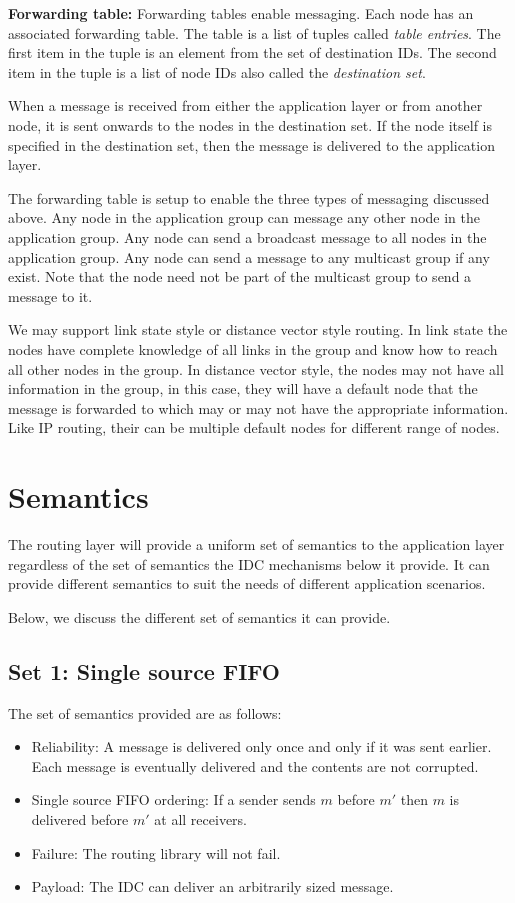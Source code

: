 \documentclass[a4paper,twoside]{report} %
\begin{document}
\textbf{Forwarding table:}
Forwarding tables enable messaging.
Each node has an associated forwarding table.
The table is a list of tuples called \emph{table entries}.
The first item in the tuple is an element from the set of destination IDs.
The second item in the tuple is a list of node IDs
also called the \emph{destination set}.

When a message is received from either the application layer or
from another node, it is sent onwards to the nodes in the destination set.
If the node itself is specified in the destination set,
then the message is delivered to the application layer.

The forwarding table is setup to enable the three types
of messaging discussed above.
Any node in the application group can message
any other node in the application group.
Any node can send a broadcast message to all nodes in the application group.
Any node can send a message to any multicast group if any exist.
Note that the node need not be part of the multicast group
to send a message to it.

We may support link state style or distance vector style routing.
In link state the nodes have complete knowledge of all links in the group
and know how to reach all other nodes in the group.
In distance vector style, the nodes may not have all information in the group,
in this case, they will have a default node that the message is forwarded to
which may or may not have the appropriate information.
Like IP routing, their can be multiple default nodes
for different range of nodes.

\section{Semantics}\label{sec:semantics}

The routing layer will provide a uniform set of semantics to the
application layer regardless of the set of semantics the
IDC mechanisms below it provide.
It can provide different semantics to suit the
needs of different application scenarios.

Below, we discuss the different set of semantics it can provide.

\subsection{Set 1: Single source FIFO}
The set of semantics provided are as follows:

\begin{itemize}
\item Reliability:
  A message is delivered only once and only if it was sent earlier.
  Each message is eventually delivered and the contents are not corrupted.
\item Single source FIFO ordering:
  If a sender sends $m$ before $m'$ then $m$ is delivered before $m'$
  at all receivers.
\item Failure:
  The routing library will not fail.
\item Payload:
  The IDC can deliver an arbitrarily sized message.
\end{itemize}
\end{document}
